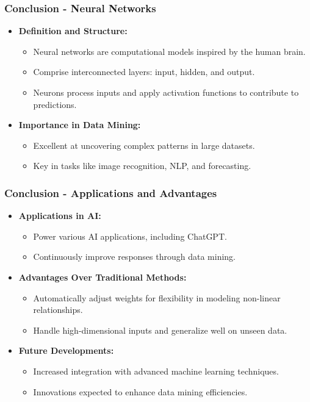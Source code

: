 \documentclass[aspectratio=169]{beamer}
\begin{document}
\begin{frame}[fragile]
    \frametitle{Conclusion - Neural Networks}
    \begin{itemize}
        \item \textbf{Definition and Structure:}
        \begin{itemize}
            \item Neural networks are computational models inspired by the human brain.
            \item Comprise interconnected layers: input, hidden, and output.
            \item Neurons process inputs and apply activation functions to contribute to predictions.
        \end{itemize}

        \item \textbf{Importance in Data Mining:}
        \begin{itemize}
            \item Excellent at uncovering complex patterns in large datasets.
            \item Key in tasks like image recognition, NLP, and forecasting.
        \end{itemize}
    \end{itemize}
\end{frame}

\begin{frame}[fragile]
    \frametitle{Conclusion - Applications and Advantages}
    \begin{itemize}
        \item \textbf{Applications in AI:}
        \begin{itemize}
            \item Power various AI applications, including ChatGPT.
            \item Continuously improve responses through data mining.
        \end{itemize}

        \item \textbf{Advantages Over Traditional Methods:}
        \begin{itemize}
            \item Automatically adjust weights for flexibility in modeling non-linear relationships.
            \item Handle high-dimensional inputs and generalize well on unseen data.
        \end{itemize}

        \item \textbf{Future Developments:}
        \begin{itemize}
            \item Increased integration with advanced machine learning techniques.
            \item Innovations expected to enhance data mining efficiencies.
        \end{itemize}
    \end{itemize}
\end{frame}
\end{document}
